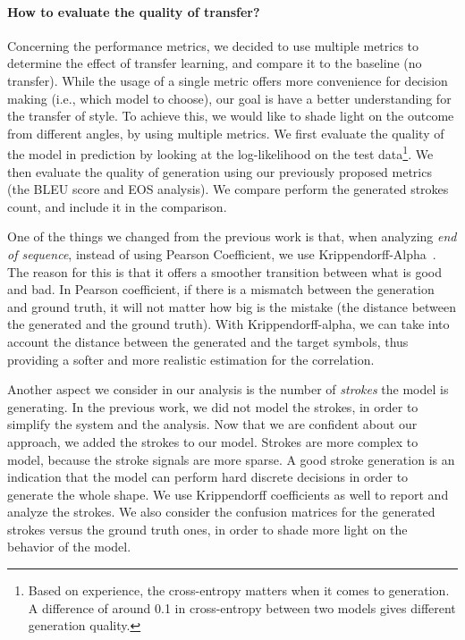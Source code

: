   \paragraph{How to evaluate the quality of transfer?} Concerning the performance metrics, we decided to use multiple metrics to determine the effect of transfer learning, and compare it to the baseline (no transfer). While the usage of a single metric offers more convenience for decision making (i.e., which model to choose), our goal is have a better understanding for the transfer of style. To achieve this, we would like to shade light on the outcome from different angles, by using multiple metrics. We first evaluate the quality of the model in prediction by looking at the log-likelihood on the test data\footnote{Based on experience, the cross-entropy matters when it comes to generation. A difference of around 0.1 in cross-entropy between two models gives different generation quality.}. We then evaluate the quality of generation using our previously proposed metrics (the BLEU score and EOS analysis). We compare perform the generated strokes count, and include it in the comparison.

  \par One of the things we changed from the previous work is that, when analyzing \textit{end of sequence}, instead of using Pearson Coefficient, we use Krippendorff-Alpha~\citep{krippendorff2011computing}. The reason for this is that it offers a smoother transition between what is good and bad. In Pearson coefficient, if there is a mismatch between the generation and ground truth, it will not matter how big is the mistake (the distance between the generated and the ground truth). With Krippendorff-alpha, we can take into account the distance between the generated and the target symbols, thus providing a softer and more realistic estimation for the correlation.

  \par Another aspect we consider in our analysis is the number of \textit{strokes} the model is generating. In the previous work, we did not model the strokes, in order to simplify the system and the analysis. Now that we are confident about our approach, we added the strokes to our model. Strokes are more complex to model, because the stroke signals are more sparse. A good stroke generation is an indication that the model can perform hard discrete decisions in order to generate the whole shape. We use Krippendorff coefficients as well to report and analyze the strokes. We also consider the confusion matrices for the generated strokes versus the ground truth ones, in order to shade more light on the behavior of the model.

